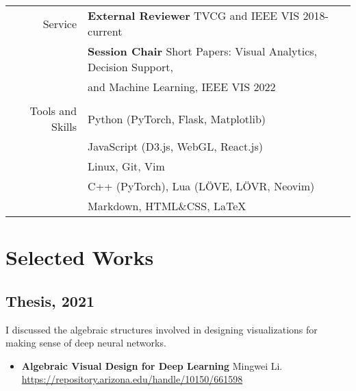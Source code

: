\documentclass[letterpaper,11pt,oneside]{article}
\begin{document}
\begin{tabular}{@{} r l}
\Large{Service}
    & \textbf{External Reviewer} TVCG and IEEE VIS 2018-current \\
    & \textbf{Session Chair} Short Papers: Visual Analytics,
    Decision Support, \\
    & and Machine Learning, IEEE VIS 2022\\
    
    \\
\Large{Tools and Skills}
    & Python (PyTorch, Flask, Matplotlib) \\
    & JavaScript (D3.js, WebGL, React.js) \\
    & Linux, Git, Vim \\
    & C++ (PyTorch), Lua (LÖVE, LÖVR, Neovim) \\ 
    & Markdown, HTML\&CSS, \LaTeX \\

\end{tabular}

\pagebreak

\section*{Selected Works}

\subsection*{Thesis, 2021}
I discussed the algebraic structures involved in designing visualizations for making sense of deep neural networks.
    \begin{itemize}
        \item \textbf{Algebraic Visual Design for Deep Learning} Mingwei Li. \url{https://repository.arizona.edu/handle/10150/661598}
    \end{itemize}
\end{document}
